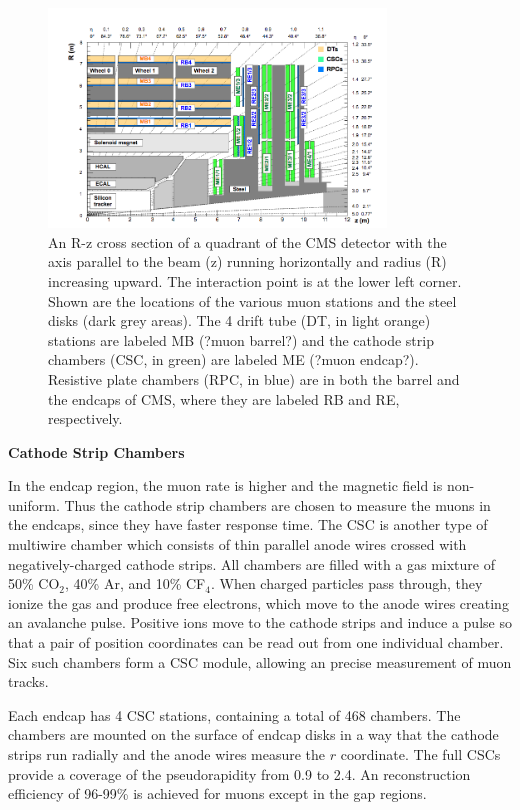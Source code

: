 \documentclass[thesis.tex]{subfiles}
\begin{document}
\begin{figure}[hbtp]
	\centering
	\includegraphics[width=0.8\textwidth]{plot/DT.png}
	\caption{An R-z cross section of a quadrant of the CMS detector with the axis parallel to the beam (z) running horizontally and radius (R) increasing upward.  The interaction point is at the lower left corner. 
	 Shown are the locations of the various muon stations and the steel disks (dark grey areas). The 4 drift tube (DT, in light orange) stations are labeled MB (?muon barrel?) and the cathode strip chambers (CSC, in green) are labeled ME (?muon endcap?).              Resistive plate chambers (RPC, in blue) are in both the barrel and the endcaps of CMS, where they are labeled RB and RE, respectively.}
	\label{fig:DT}
\end{figure}

\noindent \textbf{Cathode Strip Chambers}

In the endcap region, the muon rate is higher and the magnetic field is non-uniform.
Thus the cathode strip chambers are chosen to measure the muons in the endcaps, since they have faster response time. 
The CSC is another type of multiwire chamber which consists of thin parallel anode wires crossed with negatively-charged cathode strips.
All chambers are filled with a gas mixture of 50\% CO$_2$, 40\% Ar, and 10\% CF$_4$.
When charged particles pass through, they ionize the gas and produce free electrons, which move to the anode wires creating an avalanche pulse.
Positive ions move to the cathode strips and induce a pulse so that a pair of position coordinates can be read out from one individual chamber.
Six such chambers form a CSC module, allowing an precise measurement of muon tracks. 

Each endcap has 4 CSC stations, containing a total of 468 chambers.
The chambers are mounted on the surface of endcap disks in a way that the cathode strips run radially and the anode wires measure the $r$ coordinate. 
The full CSCs provide a coverage of the pseudorapidity from 0.9 to 2.4.
An reconstruction efficiency of 96-99\% is achieved for muons except in the gap regions. \\
\end{document}
